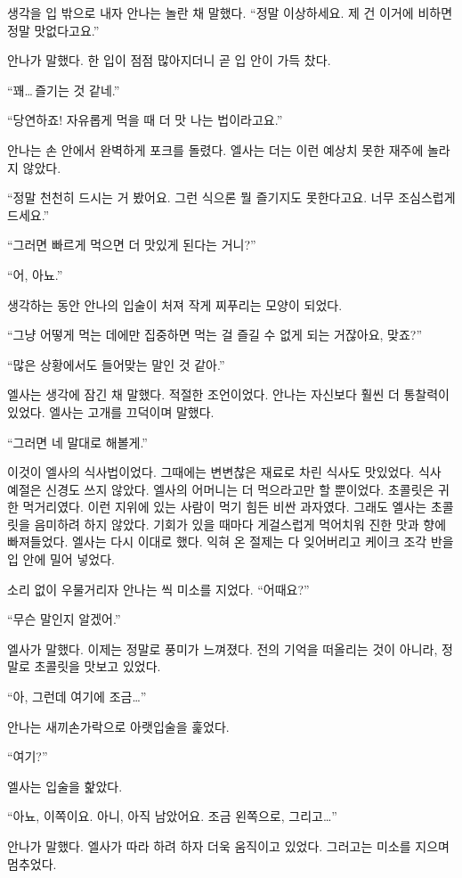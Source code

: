 생각을 입 밖으로 내자 안나는 놀란 채 말했다. ``정말 이상하세요. 제 건 이거에 비하면 정말 맛없다고요.''

안나가 말했다. 한 입이 점점 많아지더니 곧 입 안이 가득 찼다.

``꽤\ldots\,즐기는 것 같네.''

``당연하죠! 자유롭게 먹을 때 더 맛 나는 법이라고요.''

안나는 손 안에서 완벽하게 포크를 돌렸다. 엘사는 더는 이런 예상치 못한 재주에 놀라지 않았다.

``정말 천천히 드시는 거 봤어요. 그런 식으론 뭘 즐기지도 못한다고요. 너무 조심스럽게 드세요.''

``그러면 빠르게 먹으면 더 맛있게 된다는 거니?''

``어, 아뇨.''

생각하는 동안 안나의 입술이 처져 작게 찌푸리는 모양이 되었다.

``그냥 어떻게 먹는 데에만 집중하면 먹는 걸 즐길 수 없게 되는 거잖아요, 맞죠?''

`` 많은 상황에서도 들어맞는 말인 것 같아.''

엘사는 생각에 잠긴 채 말했다. 적절한 조언이었다. 안나는 자신보다 훨씬 더 통찰력이 있었다. 엘사는 고개를 끄덕이며 말했다.

``그러면 네 말대로 해볼게.''

이것이 엘사의 식사법이었다. 그때에는 변변찮은 재료로 차린 식사도 맛있었다. 식사 예절은 신경도 쓰지 않았다. 엘사의 어머니는 더 먹으라고만 할 뿐이었다. 초콜릿은 귀한 먹거리였다. 이런 지위에 있는 사람이 먹기 힘든 비싼 과자였다. 그래도 엘사는 초콜릿을 음미하려 하지 않았다. 기회가 있을 때마다 게걸스럽게 먹어치워 진한 맛과 향에 빠져들었다. 엘사는 다시 이대로 했다. 익혀 온 절제는 다 잊어버리고 케이크 조각 반을 입 안에 밀어 넣었다.

소리 없이 우물거리자 안나는 씩 미소를 지었다. ``어때요?''

``무슨 말인지 알겠어.''

엘사가 말했다. 이제는 정말로 풍미가 느껴졌다. 전의 기억을 떠올리는 것이 아니라, 정말로 초콜릿을 맛보고 있었다.

``아, 그런데 여기에 조금\ldots''

안나는 새끼손가락으로 아랫입술을 훑었다.

``여기?''

엘사는 입술을 핥았다.

``아뇨, 이쪽이요. 아니, 아직 남았어요. 조금 왼쪽으로, 그리고\ldots''

안나가 말했다. 엘사가 따라 하려 하자 더욱 움직이고 있었다. 그러고는 미소를 지으며 멈추었다.

